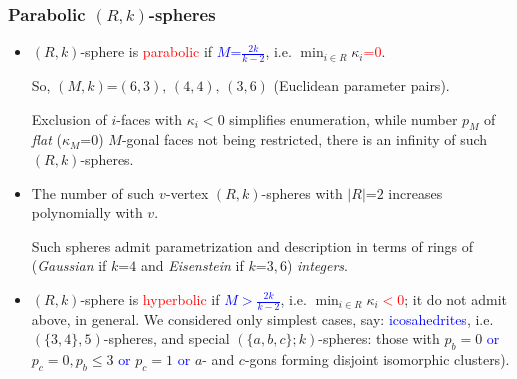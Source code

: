 \documentclass{beamer}
\begin{document}
\begin{frame}\frametitle{Parabolic $(R,k)$-spheres}

\begin{itemize}

\item $(R,k)$-sphere is \textcolor{red}{parabolic} if 
 \textcolor{blue}{$M$=$\frac{2k}{k-2}$}, i.e. $\min_{i\in 
R}\kappa_i$\textcolor{red}{=$0$}.  

So, 
$(M,k)$=$(6,3),\,(4,4),\,(3,6)$ (Euclidean parameter pairs).

Exclusion
of
$i$-faces with $\kappa_i$$<$$0$ simplifies enumeration, while
 number $p_M$
of {\em flat} ($\kappa_M$=$0$) $M$-gonal faces not being
restricted, there is an infinity of such $(R,k)$-spheres.
 

\item The number of such $v$-vertex $(R,k)$-spheres with 
$|R|$=$2$ increases polynomially with $v$.

Such spheres admit parametrization and description in terms of 
rings of ({\em Gaussian}
if $k$=$4$ and {\em Eisenstein} if $k$=$3,6$) {\em integers}.


\item $(R,k)$-sphere is \textcolor{red}{hyperbolic} if 
\textcolor{blue}{$M$$>$$\frac{2k}{k-2}$}, i.e. $\min_{i\in 
R}\kappa_i$\textcolor{red}{$<0$}; it do not 
admit above, in 
general. We  considered only simplest cases, say: \textcolor{blue}{icosahedrites}, i.e. $(\{3,4\},5)$-spheres,
and  special $(\{a,b,c\};k)$-spheres: those
 with $p_b=0$  \textcolor{blue}{or}
 $p_c=0, p_b\le 3$ 
 \textcolor{blue}{or} 
$p_c=1$  \textcolor{blue}{or}  $a$- and $c$-gons forming  disjoint isomorphic clusters).

 
\end{itemize}\end{frame}
\end{document}
